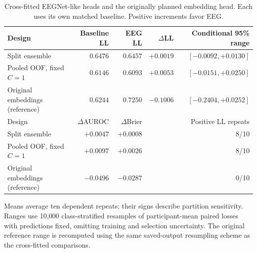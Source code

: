 \begin{table}[htbp]
\centering\small
\caption{Cross-fitted EEGNet-like heads and the originally planned embedding head. Each uses its own matched baseline. Positive increments favor EEG.}
\label{tab:eegnet}
\setlength{\tabcolsep}{4pt}
\begin{tabularx}{\textwidth}{@{}>{\raggedright\arraybackslash}Xrrrr@{}}
\toprule
Design & Baseline LL & EEG LL & $\Delta$LL & Conditional 95\% range\\\midrule
Split ensemble & $0.6476$ & $0.6457$ & $+0.0019$ & $[-0.0092,+0.0130]$\\
Pooled OOF, fixed $C=1$ & $0.6146$ & $0.6093$ & $+0.0053$ & $[-0.0151,+0.0250]$\\
Original embeddings (reference) & $0.6244$ & $0.7250$ & $-0.1006$ & $[-0.2404,+0.0252]$\\
\midrule Design & $\Delta$AUROC & $\Delta$Brier & \multicolumn{2}{r}{Positive LL repeats}\\\midrule
Split ensemble & $+0.0047$ & $+0.0008$ & \multicolumn{2}{r}{8/10}\\
Pooled OOF, fixed $C=1$ & $+0.0097$ & $+0.0026$ & \multicolumn{2}{r}{8/10}\\
Original embeddings (reference) & $-0.0496$ & $-0.0287$ & \multicolumn{2}{r}{0/10}\\
\bottomrule\end{tabularx}
\par\smallskip\begin{minipage}{\textwidth}\footnotesize Means average ten dependent repeats; their signs describe partition sensitivity. Ranges use 10,000 class-stratified resamples of participant-mean paired losses with predictions fixed, omitting training and selection uncertainty. The original reference range is recomputed using the same saved-output resampling scheme as the cross-fitted comparisons.\end{minipage}
\end{table}
